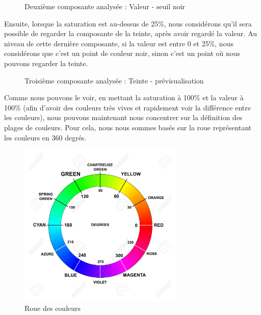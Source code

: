 \documentclass[12pt,titlepage,french]{article}
\begin{document}
\begin{figure}[H]
 \caption{\label{} Deuxième composante analysée : Valeur - seuil noir}
 \begin{center}
  \end{center}
\end{figure}

Ensuite, lorsque la saturation est au-dessus de 25\%, nous considérons qu'il sera possible de regarder la composante de la teinte, après avoir regardé la valeur. Au niveau de cette dernière composante, si la valeur est entre 0 et 25\%, nous considérons que c'est un point de couleur noir, sinon c'est un point où nous pouvons regarder la teinte.

\begin{figure}[H]
 \caption{\label{} Troisième composante analysée : Teinte - prévisualisation}
 \begin{center}
  \end{center}
\end{figure}

Comme nous pouvons le voir, en mettant la saturation à 100\% et la valeur à 100\% (afin d'avoir des couleurs très vives et rapidement voir la différence entre les couleurs), nous pouvons maintenant nous concentrer sur la définition des plages de couleurs. Pour cela, nous nous sommes basés sur la roue représentant les couleurs en 360 degrés.

\begin{figure}[H]
 \caption{\label{} Roue des couleurs}
 \begin{center}
 \includegraphics[width=0.7\textwidth]{./img/roue.jpg}
  \end{center}
\end{figure}
\end{document}
